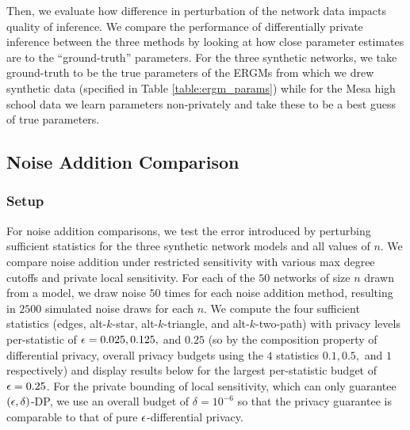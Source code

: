 Then, we evaluate how difference in perturbation of the network data impacts quality of inference. We compare the performance of differentially private inference between the three methods by looking at how close parameter estimates are to the ``ground-truth'' parameters. For the three synthetic networks, we take ground-truth to be the true parameters of the ERGMs from which we drew synthetic data (specified in Table \ref{table:ergm_params}) while for the Mesa high school data we learn parameters non-privately and take these to be a best guess of true parameters.   
 
 \subsection{Noise Addition Comparison}
 
 \subsubsection{Setup}
 For noise addition comparisons, we test the error introduced by perturbing sufficient statistics for the three synthetic network models and all values of $n$. We compare noise addition under restricted sensitivity with various max degree cutoffs and private local sensitivity. For each of the $50$ networks of size $n$ drawn from a model, we draw noise $50$ times for each noise addition method, resulting in $2500$ simulated noise draws for each $n$. We compute the four sufficient statistics (edges, alt-$k$-star, alt-$k$-triangle, and alt-$k$-two-path) with privacy levels per-statistic of $\epsilon = 0.025, 0.125,$ and $0.25$ (so by the composition property of differential privacy, overall privacy budgets using the $4$ statistics $0.1, 0.5,$ and $1$ respectively) and display results below for the largest per-statistic budget of $\epsilon = 0.25$. For the private bounding of local sensitivity, which can only guarantee $(\epsilon, \delta)$-DP, we use an overall budget of $\delta = 10^{-6}$ so that the privacy guarantee is comparable to that of pure $\epsilon$-differential privacy. 
 
